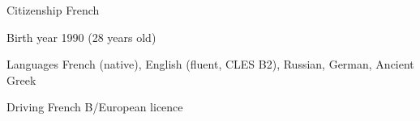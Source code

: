 
\begin{cvskills}

	\cvskill
	{Citizenship}
    {French}

	\cvskill
	{Birth year}
    {1990 (28 years old)}

	\cvskill
	{Languages}
    {French (native), English (fluent, CLES B2), Russian, German, Ancient Greek}

	\cvskill
	{Driving}
    {French B/European licence}

\end{cvskills}
